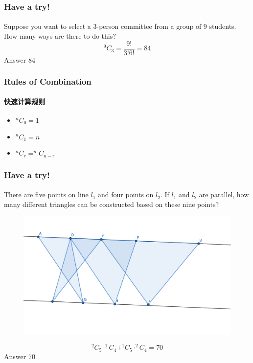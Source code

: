 \documentclass[
	11pt, %
	handout,
]{beamer}
\begin{document}

\begin{frame}
	\frametitle{Have a try!}
	\framesubtitle{}
Suppose you want to select a 3-person committee from a
group of 9 students. How many ways are there to do this?
\pause
\begin{equation*}
	^9C_3 =\frac{9!}{3!6!} = 84
\end{equation*}
\bigskip
\pause
Answer \textbf{$84$} 
\end{frame}


\begin{frame}
	\frametitle{Rules of Combination}
	\framesubtitle{快速计算规则}
	\begin{itemize}
		\item $^nC_0=1$
		\item $^nC_1=n$ 
		\item $^nC_r = ^nC_{n-r}$ 
	\end{itemize}
\end{frame}

\begin{frame}
	\frametitle{Have a try!}
	\framesubtitle{}
There are five points on line $l_1$ and four points on $l_2$. If $l_1$ and $l_2$ are parallel, how
many different triangles can be constructed based on these nine points?
  \pause
	\begin{figure}
		\includegraphics[width=0.5\linewidth]{Triangles_Combinations.png}
	\end{figure}

	$$^2C_5 \cdot ^1C_4 + ^1C_5 \cdot^2C_4 = 70$$  
	\bigskip
	\pause
Answer \textbf{$70$} 
\end{frame}

\end{document}
